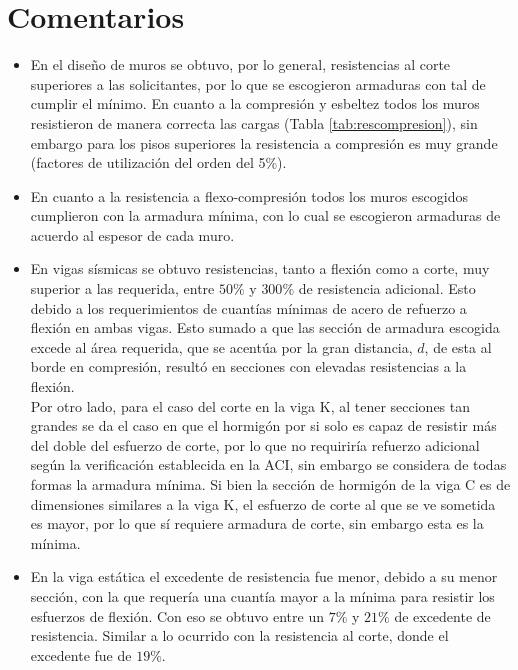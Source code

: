 \newpage

\section{Comentarios}

\begin{itemize}
    \item %
    En el diseño de muros se obtuvo, por lo general, resistencias al corte superiores a las solicitantes, por lo que se escogieron armaduras con tal de cumplir el mínimo. En cuanto a la compresión y esbeltez todos los muros resistieron de manera correcta las cargas (Tabla \ref{tab:rescompresion}), sin embargo para los pisos superiores la resistencia a compresión es muy grande (factores de utilización del orden del 5\%).
    
    \item En cuanto a la resistencia a flexo-compresión todos los muros escogidos cumplieron con la armadura mínima, con lo cual se escogieron armaduras de acuerdo al espesor de cada muro.
    
    \item En vigas sísmicas se obtuvo resistencias, tanto a flexión como a corte, muy superior a las requerida, entre $50\%$ y $300\%$ de resistencia adicional. Esto debido a los requerimientos de cuantías mínimas de acero de refuerzo a flexión en ambas vigas. Esto sumado a que las sección de armadura escogida excede al área requerida, que se acentúa por la gran distancia, $d$, de esta al borde en compresión, resultó en secciones con elevadas resistencias a la flexión.\\ 
    
    Por otro lado, para el caso del corte en la viga K, al tener secciones tan grandes se da el caso en que el hormigón por si solo es capaz de resistir más del doble del esfuerzo de corte, por lo que no requiriría refuerzo adicional según la verificación establecida en la ACI, sin embargo se considera de todas formas la armadura mínima. 
    Si bien la sección de hormigón de la viga C es de dimensiones similares a la viga K, el esfuerzo de corte al que se ve sometida es mayor, por lo que sí requiere armadura de corte, sin embargo esta es la mínima.
    
    \item En la viga estática el excedente de resistencia fue menor, debido a su menor sección, con la que requería una cuantía mayor a la mínima para resistir los esfuerzos de flexión. Con eso se obtuvo entre un $7\%$ y $21\%$ de excedente de resistencia. Similar a lo ocurrido con la resistencia al corte, donde el excedente fue de $19\%$.
\end{itemize}